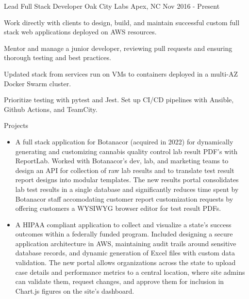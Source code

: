 

\begin{cventries}

  \cventry
    {Lead Full Stack Developer} %
    {Oak City Labs} %
    {Apex, NC} %
    {Nov 2016 - Present} %
    {
      \begin{cvitems} %
        \item {Work directly with clients to design, build, and maintain successful custom full stack web applications deployed on AWS resources.}
        \item {Mentor and manage a junior developer, reviewing pull requests and ensuring thorough testing and best practices.}
        \item {Updated stack from services run on VMs to containers deployed in a multi-AZ Docker Swarm cluster.}
        \item {Prioritize testing with pytest and Jest. Set up CI/CD pipelines with Ansible, Github Actions, and TeamCity.}
        \item {Projects
          \begin{itemize}[leftmargin=2ex, nosep, noitemsep]
          \setlength{\parskip}{0pt}
            \item {A full stack application for Botanacor (acquired in 2022) for dynamically generating and customizing cannabis quality control lab result PDF's with ReportLab. Worked with Botanacor's dev, lab, and marketing teams to design an API for collection of raw lab results and to translate test result report designs into modular templates. The new results portal consolidates lab test results in a single database and significantly reduces time spent by Botanacor staff accomodating customer report customization requests by offering customers a WYSIWYG browser editor for test result PDFs.}
            \item {A HIPAA compliant application to collect and visualize a state's success outcomes within a federally funded program. Included designing a secure application architecture in AWS, maintaining audit trails around sensitive database records, and dynamic generation of Excel files with custom data validation. The new portal allows organizations across the state to upload case details and performance metrics to a central location, where site admins can validate them, request changes, and approve them for inclusion in Chart.js figures on the site's dashboard.}

\end{itemize}}
\end{cvitems}}
\end{cventries}
